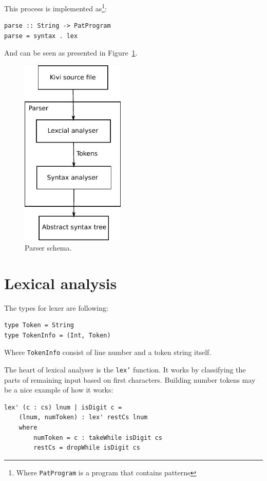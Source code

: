 \documentclass[12pt,a4paper]{report}
\begin{document}
This process is implemented as\footnote{Where \texttt{PatProgram} is a program
that contains patterns}:

\vspace*{0.2in}
\begin{lstlisting}
parse :: String -> PatProgram
parse = syntax . lex
\end{lstlisting}

And can be seen as presented in Figure~\ref{fig:parser}.

\begin{figure}[h!]
  \centering
  \includegraphics[height=9cm]{parser}
  \caption{Parser schema.}
  \label{fig:parser}
\end{figure}

\section{Lexical analysis}

The types for lexer are following:

\vspace*{0.2in}
\begin{lstlisting}
type Token = String
type TokenInfo = (Int, Token)
\end{lstlisting}
Where \texttt{TokenInfo} consist of line number and a token string itself.

The heart of lexical analyser is the \texttt{lex'} function. It works by
classifying the parts of remaining input based on first characters.  Building
number tokens may be a nice example of how it works:

\vspace*{0.2in}
\begin{lstlisting}[label=lst:lex_comment,caption={Building tokens from numbers.}]
lex' (c : cs) lnum | isDigit c =
    (lnum, numToken) : lex' restCs lnum
    where
        numToken = c : takeWhile isDigit cs
        restCs = dropWhile isDigit cs
\end{lstlisting}
\end{document}
